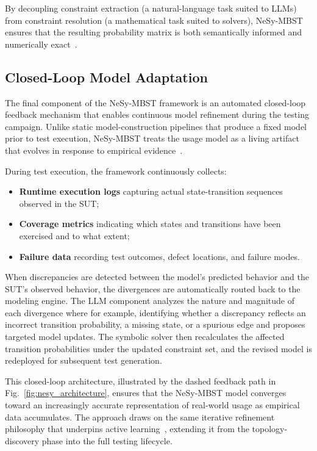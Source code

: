 By decoupling constraint extraction (a natural-language task suited to LLMs) from constraint resolution (a mathematical task suited to solvers), NeSy-MBST ensures that the resulting probability matrix is both semantically informed and numerically exact~\cite{boehr_constraints, whittaker1993markov}.

\subsection{Closed-Loop Model Adaptation}%
\label{subsec:closed_loop}

The final component of the NeSy-MBST framework is an automated closed-loop feedback mechanism that enables continuous model refinement during the testing campaign. Unlike static model-construction pipelines that produce a fixed model prior to test execution, NeSy-MBST treats the usage model as a living artifact that evolves in response to empirical evidence~\cite{taxonomy_mbt}.

During test execution, the framework continuously collects:
\begin{itemize}
    \item \textbf{Runtime execution logs} capturing actual state-transition sequences observed in the SUT;
    \item \textbf{Coverage metrics} indicating which states and transitions have been exercised and to what extent;
    \item \textbf{Failure data} recording test outcomes, defect locations, and failure modes.
\end{itemize}

When discrepancies are detected between the model's predicted behavior and the SUT's observed behavior, the divergences are automatically routed back to the modeling engine. The LLM component analyzes the nature and magnitude of each divergence where for example, identifying whether a discrepancy reflects an incorrect transition probability, a missing state, or a spurious edge and proposes targeted model updates. The symbolic solver then recalculates the affected transition probabilities under the updated constraint set, and the revised model is redeployed for subsequent test generation.

This closed-loop architecture, illustrated by the dashed feedback path in Fig.~\ref{fig:nesy_architecture}, ensures that the NeSy-MBST model converges toward an increasingly accurate representation of real-world usage as empirical data accumulates. The approach draws on the same iterative refinement philosophy that underpins active learning~\cite{lstar_llm}, extending it from the topology-discovery phase into the full testing lifecycle.
